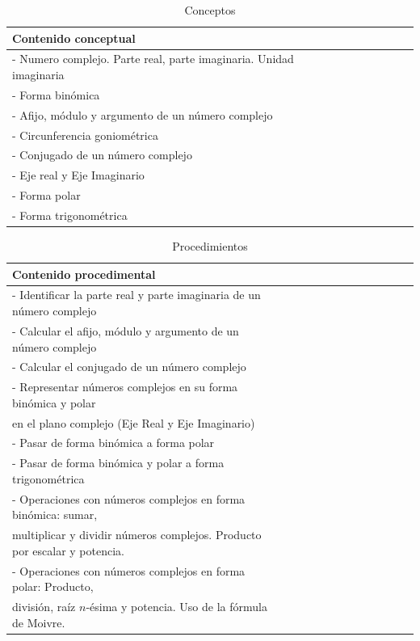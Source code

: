 \documentclass[../main.tex]{memoir}
\begin{document}
\begin{table}[H]
	\centering
	\begin{tabular}{lcccccc}
		\toprule
		\hspace{2.5cm}Contenido conceptual \\
		\midrule
		- Numero complejo. Parte real, parte imaginaria. Unidad imaginaria \\
		- Forma binómica \\
		- Afijo, módulo y argumento de un número complejo \\
		- Circunferencia goniométrica \\
		- Conjugado de un número complejo \\
		- Eje real y Eje Imaginario \\
		- Forma polar \\
		- Forma trigonométrica\\
		\bottomrule
	\end{tabular}
	\caption{Conceptos}
	\label{tab:conceptos}
\end{table}


\begin{table}[H]
	\centering
	\begin{tabular}{lcccccccccccc}
		\toprule
		\hspace{4cm}Contenido procedimental \\
		\midrule
		- Identificar la parte real y parte imaginaria de un número complejo \\
		- Calcular el afijo, módulo y argumento de un número complejo \\
		- Calcular el conjugado de un número complejo \\
		- Representar números complejos en su forma binómica y polar\\
		\hspace{0.2cm} en el plano complejo (Eje Real y Eje Imaginario) \\
		- Pasar de forma binómica a forma polar \\
		- Pasar de forma binómica y polar a forma trigonométrica\\
		- Operaciones con números complejos en forma binómica: sumar, \\ \hspace{0.2cm}multiplicar y dividir números complejos. Producto por escalar y potencia. \\
		- Operaciones con números complejos en forma polar: Producto, \\
		\hspace{0.2cm}división, raíz $n$-ésima y potencia. Uso de la fórmula de Moivre.\\
		\bottomrule
	\end{tabular}
	\caption{Procedimientos}
	\label{tab:procedimientos}
\end{table}
\end{document}
